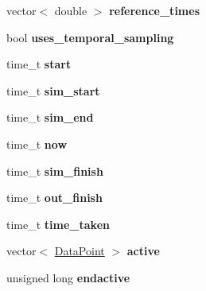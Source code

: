 \begin{DoxyCompactItemize}
\item 
vector$<$ double $>$ {\bfseries reference\+\_\+times}\hypertarget{class_tree_a56bb1ea64368f5b705360a435350f9d5}{}\label{class_tree_a56bb1ea64368f5b705360a435350f9d5}

\item 
bool {\bfseries uses\+\_\+temporal\+\_\+sampling}\hypertarget{class_tree_abed1688c75153c4af4e8c574a26dd636}{}\label{class_tree_abed1688c75153c4af4e8c574a26dd636}

\item 
time\+\_\+t {\bfseries start}\hypertarget{class_tree_ac077d686ee96b123aa779e8a8a5de3ce}{}\label{class_tree_ac077d686ee96b123aa779e8a8a5de3ce}

\item 
time\+\_\+t {\bfseries sim\+\_\+start}\hypertarget{class_tree_a01cc9b30f2b10b9f51b218df25b13b09}{}\label{class_tree_a01cc9b30f2b10b9f51b218df25b13b09}

\item 
time\+\_\+t {\bfseries sim\+\_\+end}\hypertarget{class_tree_a26100477c7e58a9e0a90cdee1379ed69}{}\label{class_tree_a26100477c7e58a9e0a90cdee1379ed69}

\item 
time\+\_\+t {\bfseries now}\hypertarget{class_tree_a5510d0fb5deb23fd39a2619d104f85fa}{}\label{class_tree_a5510d0fb5deb23fd39a2619d104f85fa}

\item 
time\+\_\+t {\bfseries sim\+\_\+finish}\hypertarget{class_tree_ac399ba59be9dc33a04223d10a82ee5ee}{}\label{class_tree_ac399ba59be9dc33a04223d10a82ee5ee}

\item 
time\+\_\+t {\bfseries out\+\_\+finish}\hypertarget{class_tree_a5ee1fa5adf72bb599badc041fbee7d09}{}\label{class_tree_a5ee1fa5adf72bb599badc041fbee7d09}

\item 
time\+\_\+t {\bfseries time\+\_\+taken}\hypertarget{class_tree_abd18bb487c0192588b6bed6f00bcfd07}{}\label{class_tree_abd18bb487c0192588b6bed6f00bcfd07}

\item 
vector$<$ \hyperlink{class_data_point}{Data\+Point} $>$ {\bfseries active}\hypertarget{class_tree_aad809474d3389ddc719c6140a6164490}{}\label{class_tree_aad809474d3389ddc719c6140a6164490}

\item 
unsigned long {\bfseries endactive}\hypertarget{class_tree_ab478831f09c135bc9a4bc991c9fd5076}{}\label{class_tree_ab478831f09c135bc9a4bc991c9fd5076}


\end{DoxyCompactItemize}
